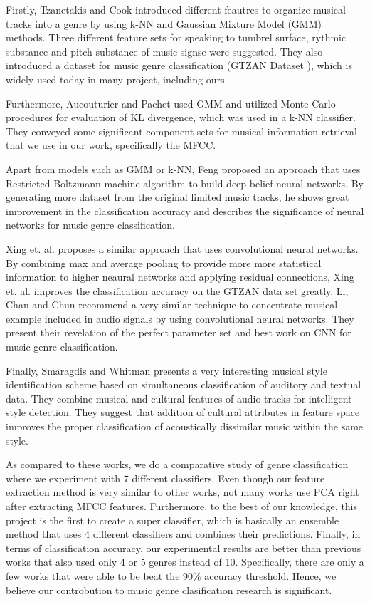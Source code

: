 Firstly, Tzanetakis and Cook \cite{GTZAN:2002} introduced different feautres to organize musical tracks into a genre by using k-NN and Gaussian Mixture Model (GMM) methods. Three different feature sets for speaking to tumbrel surface, rythmic substance and pitch substance of music signse were suggested. They also introduced a dataset for music genre classification (GTZAN Dataset \cite{GTZAN:2002}), which is widely used today in many project, including ours. 

Furthermore, Aucouturier and Pachet \cite{Pachet:2003} used GMM and utilized Monte Carlo procedures for evaluation of KL divergence, which was used in a k-NN classifier. They conveyed some significant component sets for musical information retrieval that we use in our work, specifically the MFCC. 

Apart from models such as GMM or k-NN, Feng \cite{Feng:2016} proposed an approach that uses Restricted Boltzmann machine algorithm to build deep belief neural networks. By generating more dataset from the original limited music tracks, he shows great improvement in the classification accuracy and describes the significance of neural networks for music genre classification. 

Xing et. al. \cite{Xing:2016} proposes a similar approach that uses convolutional neural networks. By combining max and average pooling to provide more more statistical information to higher neaural networks and applying residual connections, Xing et. al. \cite{Xing:2016} improves the classification accuracy on the GTZAN data set greatly. Li, Chan and Chun \cite{Chun:2010} recommend a very similar technique to concentrate musical example included in audio signals by using convolutional neural networks. They present their revelation of the perfect parameter set and best work on CNN for music genre classification.

Finally, Smaragdis and Whitman \cite{Smaragdis:2002} presents a very interesting musical style identification scheme based on simultaneous classification of auditory and textual data. They combine musical and cultural features of audio tracks for intelligent style detection. They suggest that addition of cultural attributes in feature space improves the proper classification of acoustically dissimilar music within the same style.

As compared to these works, we do a comparative study of genre classification where we experiment with 7 different classifiers. Even though our feature extraction method is very similar to other works, not many works use PCA right after extracting MFCC features. Furthermore, to the best of our knowledge, this project is the first to create a super classifier, which is basically an ensemble method that uses 4 different classifiers and combines their predictions. Finally, in terms of classification accuracy, our experimental results are better than previous works that also used only 4 or 5 genres instead of 10. Specifically, there are only a few works that were able to be beat the 90\% accuracy threshold. Hence, we believe our controbution to music genre clasification research is significant.  

